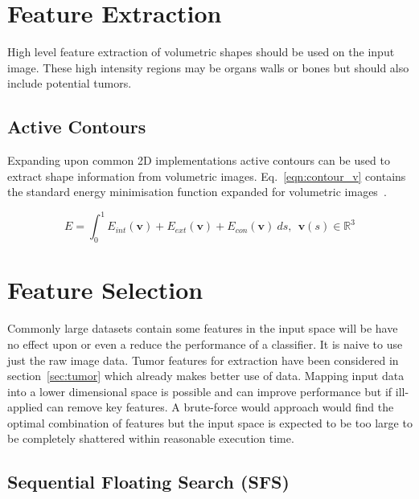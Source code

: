 \documentclass[journal]{IEEEtran}
\begin{document}
\section{Feature Extraction}
\label{sec:extraction}

High level feature extraction of volumetric shapes should be used on the input image.
These high intensity regions may be organs walls or bones but should also include potential tumors.




\subsection{Active Contours}

Expanding upon common 2D implementations active contours can be used to extract shape information from volumetric images.
Eq.~\eqref{eqn:contour_v} contains the standard energy minimisation function expanded for volumetric images~\cite{nixon02feature,skalski13automatic}. 

\begin{equation}
	E = \int_0^{1} E_{int}(\mathbf{v}) + E_{ext}(\mathbf{v}) + E_{con}(\mathbf{v})\:ds,\:\:\mathbf{v}(s) \in \mathbb{R}^3
	\label{eqn:contour_v}
\end{equation}













\section{Feature Selection}
\label{sec:selection}

Commonly large datasets contain some features in the input space will be have no effect upon or even a reduce the performance of a classifier.
It is naive to use just the raw image data.
Tumor features for extraction have been considered in section~\ref{sec:tumor} which already makes better use of data. 
Mapping input data into a lower dimensional space is possible and can improve performance but if ill-applied can remove key features.
A brute-force would approach would find the optimal combination of features but the input space is expected to be too large to be completely shattered within reasonable execution time. 


\subsection{Sequential Floating Search (SFS)}
\end{document}
